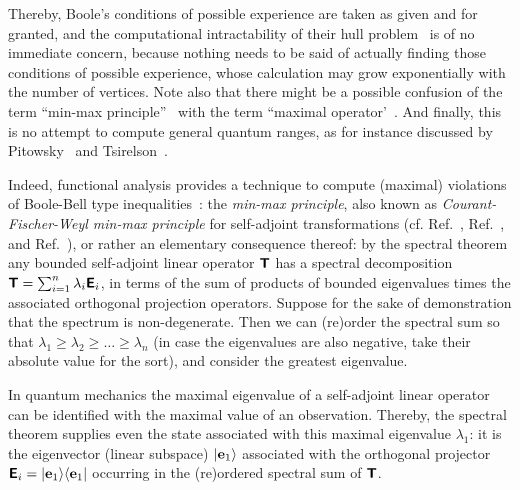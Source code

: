 Thereby, Boole's conditions of possible
experience are taken as given and for granted, and the computational intractability of their hull problem~\cite{Pit-91}
is of no immediate concern, because nothing needs to be said of actually finding  those conditions of possible experience, whose
calculation may grow exponentially with the number of vertices.
Note also that there might be a possible confusion of the term ``min-max principle''~\cite[{\S}~90]{halmos-vs} with
the term ``maximal operator'~\cite[{\S}~84]{halmos-vs}.
And finally, this is no attempt to compute general quantum ranges,
as for instance discussed by Pitowsky~\cite{pitowsky-86,pit:range-2001,Pitowsky-08-ge}
and Tsirelson~\cite{cirelson:80,cirelson:87,cirelson}.

Indeed, functional analysis provides a technique to compute (maximal) violations of Boole-Bell type inequalities~\cite{filipp-svo-04-qpoly,filipp-svo-05}:
the
{\em min-max principle},
also known as
{\em Courant-Fischer-Weyl min-max principle} for self-adjoint transformations
(cf. Ref.~\cite[{\S}~90]{halmos-vs},  Ref.~\cite[pp.~75ff]{reed-sim4},
and  Ref.~\cite[Section~4.4, pp.~142ff]{Teschl-schr}),
or rather an elementary consequence thereof:
by the spectral theorem any bounded self-adjoint linear operator $\textsf{\textbf{T}}$ has a spectral decomposition
$\textsf{\textbf{T}}=\sum_{i=1}^{n} \lambda_i \textsf{\textbf{E}}_i$, in terms of the sum of products
of bounded eigenvalues times the associated orthogonal projection operators.
Suppose for the sake of demonstration that the spectrum is non-degenerate.
Then we can (re)order the spectral sum so that $\lambda_1 \ge \lambda_2 \ge \ldots \ge \lambda_n$
(in case the eigenvalues are also negative, take their absolute value for the sort),
and consider  the greatest eigenvalue.%

In quantum mechanics  the maximal eigenvalue of a self-adjoint linear operator can be identified
with the maximal value of an observation.
Thereby, the spectral theorem supplies even the state associated with this maximal eigenvalue $\lambda_1$: it is the
eigenvector (linear subspace)  $\vert {\bf e}_1 \rangle $ associated with the orthogonal projector
 $\textsf{\textbf{E}}_i = \vert {\bf e}_1 \rangle \langle  {\bf e}_1 \vert $ occurring in the (re)ordered
spectral sum  of $\textsf{\textbf{T}}$.

